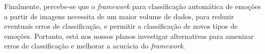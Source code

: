Finalmente, percebe-se que o \textit{framework} para classificação automática de emoções a partir de imagens necessita de um maior volume de dados, para reduzir eventuais erros de classificação, e permitir a classificação de novos tipos de emoções. Portanto, está nos nossos planos investigar alternativas para amenizar erros de classificação e melhorar a acurácia do \textit{framework}.

